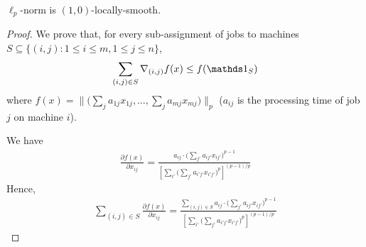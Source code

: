 \begin{lemma} \label{lem-makespan}
$\ell_{p}$-norm is $(1,0)$-locally-smooth.
\end{lemma}
%
\begin{proof}
We prove that, for every sub-assignment of jobs to machines $S \subseteq \{(i,j): 1 \leq i \leq m, 1 \leq j \leq n\}$,
%
\begin{align}	\label{ineq:lp-smooth}
\sum_{(i,j) \in S} \nabla_{(i,j)} f(x) \leq  f(\one_{S}) 
\end{align}
where $f(x) = \| \bigl( \sum_{j} a_{1j} x_{1j}, \ldots, \sum_{j} a_{mj} x_{mj} \bigr)\|_{p}$
($a_{ij}$ is the processing time of job $j$ on machine $i$).


We have
%
\begin{align*}
\frac{\partial f(x)}{\partial x_{ij}}
= \frac{a_{ij} \cdot \bigl( \sum_{j'} a_{ij'} x_{ij'} \bigr)^{p-1} }{ \left[ \sum_{i'} \bigl( \sum_{j'} a_{i'j'} x_{i'j'} \bigr)^{p} \right]^{(p-1)/p}}
\end{align*}
Hence,
\begin{align*}
\sum_{(i,j) \in S} \frac{\partial f(x)}{\partial x_{ij}}
= \frac{ \sum_{(i,j) \in S} a_{ij} \cdot \bigl( \sum_{j'} a_{ij'} x_{ij'} \bigr)^{p-1} }{ \left[ \sum_{i'} \bigl( \sum_{j'} a_{i'j'} x_{i'j'} \bigr)^{p} \right]^{(p-1)/p}}
\end{align*}


\end{proof}
